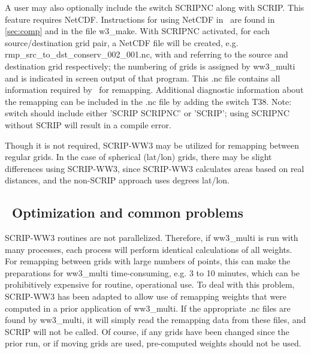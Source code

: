 A user may also optionally include the switch {\F SCRIPNC} along with {\F
  SCRIP}. This feature requires NetCDF. Instructions for using NetCDF in \ws\
are found in \para\ref{sec:comp} and in the file {\file w3\_make}. With {\F
  SCRIPNC} activated, for each source/destination grid pair, a NetCDF file
will be created, e.g. {\file rmp\_src\_to\_dst\_conserv\_002\_001.nc}, with
{\file 002} and {\file 001} referring to the source and destination grid
respectively; the numbering of grids is assigned by {\file ww3\_multi} and is
indicated in screen output of that program. This {\file .nc} file contains all
information required by \ws\ for remapping. Additional diagnostic information
about the remapping can be included in the {\file .nc} file by adding the
switch {\F T38}. Note: {\file switch} should include either {\F 'SCRIP
  SCRIPNC'} or {\F 'SCRIP'}; using {\F SCRIPNC} without {\F SCRIP} will result
in a compile error.

Though it is not required, SCRIP-WW3 may be utilized for remapping between
regular grids. In the case of spherical (lat/lon) grids, there may be slight
differences using SCRIP-WW3, since SCRIP-WW3 calculates areas based on real
distances, and the non-SCRIP approach uses degrees lat/lon.

\vssub
\subsection{~Optimization and common problems} \label{sec:scripD}
\vssub

SCRIP-WW3 routines are not parallelized. Therefore, if {\file ww3\_multi} is
run with many processes, each process will perform identical calculations of
all weights. For remapping between grids with large numbers of points, this
can make the preparations for {\file ww3\_multi} time-consuming, e.g. 3 to 10
minutes, which can be prohibitively expensive for routine, operational use. To
deal with this problem, SCRIP-WW3 has been adapted to allow use of remapping
weights that were computed in a prior application of {\file ww3\_multi}. If
the appropriate {\file .nc} files are found by {\file ww3\_multi}, it will
simply read the remapping data from these files, and SCRIP will not be
called. Of course, if any grids have been changed since the prior run, or if
moving grids are used, pre-computed weights should not be used.

